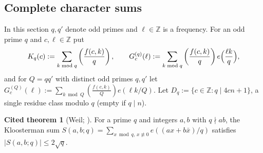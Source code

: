 \documentclass[11pt,reqno]{amsart}
\theoremstyle{definition}
\newtheorem{citedthm}[theorem]{Cited theorem}
\newcommand{\Z}{\mathbb Z}
\newcommand{\leg}[2]{\left(\frac{#1}{#2}\right)}
\begin{document}
\subsection{Complete character sums}
In this section $q,q'$ denote odd primes and $\ell\in\Z$ is a frequency.
For an odd prime $q$ and $c,\ell\in\Z$ put
\[
 K_q(c):=\sum_{k\bmod q}\leg{f(c,k)}q,\qquad
 G_c^{(q)}(\ell):=\sum_{k\bmod q}\leg{f(c,k)}q e\Bigl(\frac{\ell k}q\Bigr),
\]
and for $Q=qq'$ with distinct odd primes $q,q'$ let
$G^{(Q)}_c(\ell):=\sum_{k\bmod Q}\leg{f(c,k)}{Q}e(\ell k/Q)$.  Let
$D_q:=\{c\in\Z: q\mid 4cn+1\}$, a single residue class modulo $q$ (empty
if $q\mid n$).

\begin{citedthm}[Weil; {\cite[Thm.~11.11, Cor.~11.12]{IK}}]\label{cit:weil}
For a prime $q$ and integers $a,b$ with $q\nmid ab$, the Kloosterman sum
$S(a,b;q)=\sum_{x\bmod q,\,x\not\equiv0}e((ax+b\bar x)/q)$ satisfies
$|S(a,b;q)|\le2\sqrt q$.
\end{citedthm}
\end{document}
